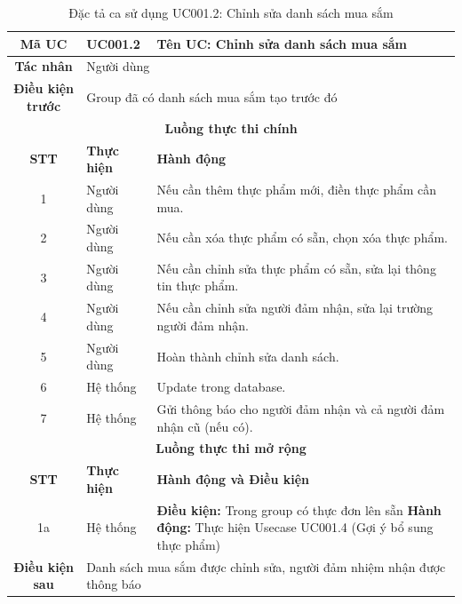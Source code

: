 \begin{table}[H]
    \centering
    \label{tab:uc001-2}
    \begin{tabularx}{\textwidth}{|c|p{3.5cm}|X|}
        \hline
        \rowcolor{headergreen} 
        \textbf{Mã UC} & \textbf{UC001.2} & \textbf{Tên UC: Chỉnh sửa danh sách mua sắm} \\ \hline
        \textbf{Tác nhân} & \multicolumn{2}{l|}{Người dùng} \\ \hline
        \textbf{Điều kiện trước} & \multicolumn{2}{X|}{Group đã có danh sách mua sắm tạo trước đó} \\ \hline
        
        \multicolumn{3}{|c|}{\cellcolor{headerorange}\textbf{Luồng thực thi chính}} \\ \hline
        \rowcolor{graybg} \textbf{STT} & \textbf{Thực hiện} & \textbf{Hành động} \\ \hline
        1 & Người dùng & Nếu cần thêm thực phẩm mới, điền thực phẩm cần mua. \\ \hline
        2 & Người dùng & Nếu cần xóa thực phẩm có sẵn, chọn xóa thực phẩm. \\ \hline
        3 & Người dùng & Nếu cần chỉnh sửa thực phẩm có sẵn, sửa lại thông tin thực phẩm. \\ \hline
        4 & Người dùng & Nếu cần chỉnh sửa người đảm nhận, sửa lại trường người đảm nhận. \\ \hline
        5 & Người dùng & Hoàn thành chỉnh sửa danh sách. \\ \hline
        6 & Hệ thống & Update trong database. \\ \hline
        7 & Hệ thống & Gửi thông báo cho người đảm nhận và cả người đảm nhận cũ (nếu có). \\ \hline
        
        \multicolumn{3}{|c|}{\cellcolor{headerorange}\textbf{Luồng thực thi mở rộng}} \\ \hline
        \rowcolor{graybg} \textbf{STT} & \textbf{Thực hiện} & \textbf{Hành động và Điều kiện} \\ \hline
        1a & Hệ thống & \textbf{Điều kiện:} Trong group có thực đơn lên sẵn \newline \textbf{Hành động:} Thực hiện Usecase UC001.4 (Gợi ý bổ sung thực phẩm) \\ \hline
        
        \textbf{Điều kiện sau} & \multicolumn{2}{X|}{Danh sách mua sắm được chỉnh sửa, người đảm nhiệm nhận được thông báo} \\ \hline
    \end{tabularx}
    \caption{Đặc tả ca sử dụng UC001.2: Chỉnh sửa danh sách mua sắm}
\end{table}

